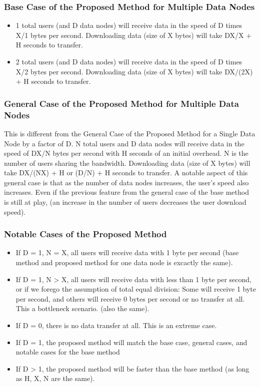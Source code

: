 \documentclass[acmsmall]{acmart}
\begin{document}
\subsubsection{Base Case of the Proposed Method for Multiple Data Nodes}
\begin{itemize}
    \item 1 total users (and D data nodes) will receive data in the speed of D times X/1 bytes per second. Downloading data (size of X bytes) will take DX/X + H seconds to transfer.
    \item 2 total users (and D data nodes) will receive data in the speed of D times X/2 bytes per second. Downloading data (size of X bytes) will take DX/(2X) + H seconds to transfer.
\end{itemize}




\subsubsection{General Case of the Proposed Method for Multiple Data Nodes} 
This is different from the General Case of the Proposed Method for a Single Data Node by a factor of D. N total users and D data nodes will receive data in the speed of DX/N bytes per second with H seconds of an initial overhead. N is the number of users sharing the bandwidth. Downloading data (size of X bytes)  will take DX/(NX) + H or (D/N) + H seconds to transfer. A notable aspect of this general case is that as the number of data nodes increases, the user's speed also increases. Even if the previous feature from the general case of the base method is still at play, (an increase in the number of users decreases the user download speed).

\subsubsection{Notable Cases of the Proposed Method}
\begin{itemize}
    \item  If D = 1, N = X, all users will receive data with 1 byte per second (base method and proposed method for one data node is excactly the same).
    \item If D = 1, N > X, all users will receive data with less than 1 byte per second, or if we forego the assumption of total equal division: Some will receive 1 byte per second, and others will receive 0 bytes per second or no transfer at all. This a bottleneck scenario. (also the same).
    \item If D = 0, there is no data transfer at all. This is an extreme case.
    \item If D = 1, the proposed method will match the base case, general cases, and notable cases for the base method
    \item If D > 1, the proposed method will be faster than the base method (as long as H, X, N are the same).
\end{itemize}
\end{document}
